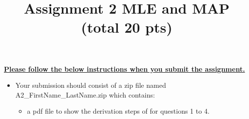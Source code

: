 \documentclass{exam}
\title{Assignment 2 MLE and MAP (total 20 pts)}
\date{}
\begin{document}
\maketitle
\thispagestyle{headandfoot}

\begin{center}
  {}
\end{center}
\vspace{.5cm}

\underline{\bf Please follow the below instructions when you submit the assignment.}
\begin{itemize}
\item Your submission should consist of a zip file named A2\_FirstName\_LastName.zip which contains: 
\begin{itemize}
\item  a pdf file to show the derivation steps of for questions 1 to 4.
\end{itemize}
\end{itemize}
\end{document}
